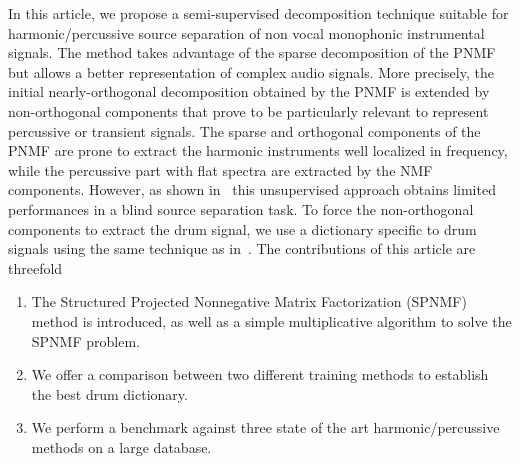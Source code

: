 In this article, we propose a semi-supervised decomposition technique suitable for harmonic/percussive source separation of non vocal monophonic instrumental signals. The method takes advantage of the sparse decomposition of the PNMF but allows a better representation of complex audio signals. More precisely, the initial nearly-orthogonal decomposition obtained by the PNMF is extended by non-orthogonal components that prove to be particularly relevant to represent percussive or transient signals. The sparse and orthogonal components of the PNMF are prone to extract the harmonic instruments well localized in frequency, while the percussive part with flat spectra are extracted by the NMF components. However, as shown in~\cite{laroche2015structured} this unsupervised approach obtains limited performances in a blind source separation task. To force the non-orthogonal components to extract the drum signal, we use a dictionary specific to drum signals using the same technique as in~\cite{wudrum}.
The contributions of this article are threefold
\begin{enumerate}
\item The Structured Projected Nonnegative Matrix Factorization (SPNMF) method is introduced, as well as a simple multiplicative algorithm to solve the SPNMF problem.
\item  We offer a comparison between two different training methods to establish the best drum dictionary.
\item We perform a benchmark against three state of the art harmonic/percussive methods on a large database.	
\end{enumerate}

